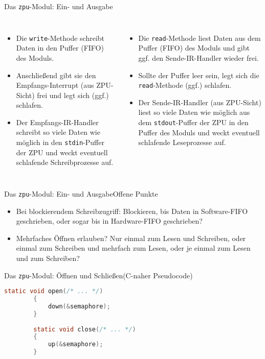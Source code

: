 \documentclass[10pt]{beamer}
\begin{document}
	\begin{frame}{Das \texttt{zpu}-Modul: Ein- und Ausgabe}
	\begin{columns}
		\begin{itemize}
			\item Die \texttt{write}-Methode schreibt Daten in den Puffer (FIFO) des Moduls.
			\item Anschließend gibt sie den Empfangs-Interrupt (aus ZPU-Sicht) frei und legt sich (ggf.) schlafen.
			\item Der Empfangs-IR-Handler schreibt so viele Daten wie möglich in den \texttt{stdin}-Puffer der ZPU und weckt eventuell schlafende Schreibprozesse auf.
		\end{itemize}
		\begin{itemize}
			\item Die \texttt{read}-Methode liest Daten aus dem Puffer (FIFO) des Moduls und gibt ggf. den Sende-IR-Handler wieder frei.
			\item Sollte der Puffer leer sein, legt sich die \texttt{read}-Methode (ggf.) schlafen.
			\item Der Sende-IR-Handler (aus ZPU-Sicht) liest so viele Daten wie möglich aus dem \texttt{stdout}-Puffer der ZPU in den Puffer des Moduls und weckt eventuell schlafende Leseprozesse auf.
		\end{itemize}
	\end{columns}
	\end{frame}
	
	\begin{frame}{Das \texttt{zpu}-Modul: Ein- und Ausgabe}{Offene Punkte}
		\begin{itemize}
			\item Bei blockierendem Schreibzugriff: Blockieren, bis Daten in Software-FIFO geschrieben, oder sogar bis in Hardware-FIFO geschrieben?
			\item Mehrfaches Öffnen erlauben? Nur einmal zum Lesen und Schreiben, oder einmal zum Schreiben und mehrfach zum Lesen, oder je einmal zum Lesen und zum Schreiben?
		\end{itemize}
	\end{frame}
	
	\begin{frame}[fragile]{Das \texttt{zpu}-Modul: Öffnen und Schließen}{(C-naher Pseudocode)}
		\begin{lstlisting}[language=C]
		static void open(/* ... */)
		{
		    down(&semaphore);
		}
		
		static void close(/* ... */)
		{
		    up(&semaphore);
		}
		\end{lstlisting}
	\end{frame}
	
\end{document}
